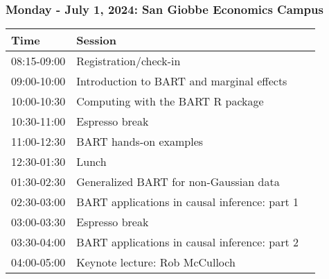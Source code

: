 \documentclass[11pt,pdftex,dvipsnames,usenames,helvetica]{beamer}
\begin{document}
\boldmath

\begin{comment}
\begin{frame}[fragile]
\frametitle{High-level outline: Bayesian Ensemble Learning}

\begin{enumerate}
\item Bayes' Theorem and Bayesianism
\item Machine/Statistical Learning and Ensembles with Binary Trees
\item Bayesian Additive Regression Trees: BART
\item Heteroskedastic BART 
\item R and BART packages
\item Continuous outcomes
\item Dichotomous/categorical outcomes
\item Time-to-event outcomes
\item Monotonic BART 
\item Brief review of recent BART results and extensions 
\end{enumerate}

\end{frame}
\end{comment}

\begin{frame}[fragile]
\frametitle{Monday - July 1, 2024: San Giobbe Economics Campus}
\begin{center}
\begin{tabular}{lll}
Time        & Session                            &  \\ \hline
08:15-09:00 & Registration/check-in            &  \\ \hline
09:00-10:00 & Introduction to BART and marginal effects               & \\  
10:00-10:30 & Computing with the BART R package               & \\ \hline
10:30-11:00 & Espresso break & \\ \hline
11:00-12:30 & BART hands-on examples             &  \\ \hline 
12:30-01:30 & Lunch  \\  \hline
01:30-02:30 & Generalized BART for non-Gaussian data             & \\
02:30-03:00 & BART applications in causal inference: part 1 & \\ \hline
03:00-03:30 & Espresso break                              & \\ \hline
03:30-04:00 & BART applications in causal inference: part 2 & \\ 
04:00-05:00 & Keynote lecture: Rob McCulloch           & \\ 
\end{tabular}
\end{center}
\end{frame}
\end{document}
